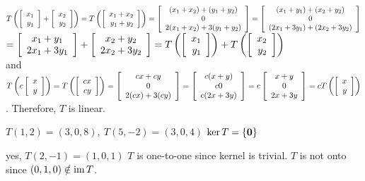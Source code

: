 
\begin{enumerate}[!HW!, start=1]
\itemspade $T\left(\vr{x_1\\y_1} + \vr{x_2\\y_2}\right) = T\left(\vr{x_1+x_2\\y_1+y_2}\right) = \mtx{c}{(x_1+x_2) + (y_1+y_2) \\ 0 \\ 2(x_1+x_2) + 3(y_1+y_2)} = \mtx{c}{(x_1+y_1) + (x_2+y_2) \\ 0 \\ (2x_1+3y_1) + (2x_2+3y_2)}$\\ $= \mtx{c}{x_1+y_1\\2x_1+3y_1} + \mtx{c}{x_2+y_2\\2x_2+3y_2} = T\left(\vr{x_1\\y_1}\right) + T\left(\vr{x_2\\y_2}\right)$\\ and\\ $T\left(c\vr{x\\y}\right) = T\left(\vr{cx\\cy}\right) = \mtx{c}{cx+cy \\ 0 \\ 2(cx) + 3(cy)} = \mtx{c}{c(x+y) \\ c0 \\ c(2x+3y)} = c\mtx{c}{x+y\\0\\2x+3y} = cT\left(\vr{x\\y}\right)$. Therefore, $T$ is linear.
\begin{multicols}{2}
\itemspade $T(1,2) = (3,0,8),\ T(5,-2) = (3, 0, 4)$ 
\itemspade $\ker T =\{\bb 0\}$ 
\end{multicols}
\itemspade yes, $T(2,-1) = (1,0,1)$
\itemspade $T$ is one-to-one since kernel is trivial. $T$ is not onto since $(0,1,0)\notin \im T$.


\end{enumerate}
